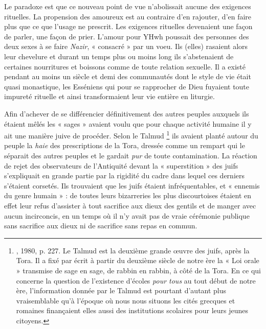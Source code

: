 Le paradoxe est que ce nouveau point de vue n'abolissait aucune des exigences rituelles. La propension des amoureux est au contraire d'en rajouter, d'en faire plus que ce que l'usage ne prescrit. Les exigences rituelles devenaient une façon de parler, une façon de prier. L'amour pour YHwh poussait des personnes des deux sexes à se faire \emph{Nazir}, « consacré » par un voeu. Ils (elles) rasaient alors leur chevelure et durant un temps plus ou moins long ils s'abstenaient de certaines nourritures et boissons comme de toute relation sexuelle. Il a existé pendant au moins un siècle et demi des communautés dont le style de vie était quasi monastique, les Esséniens qui pour se rapprocher de Dieu fuyaient toute impureté rituelle et ainsi transformaient leur vie entière en liturgie.
 
 Afin d'achever de se différencier définitivement des autres peuples auxquels ils étaient mêlés les « sages » avaient voulu que pour chaque activité humaine il y ait une manière juive de procéder. Selon le Talmud%
\footnote{, 1980, p. 227. Le Talmud est la deuxième grande œuvre des juifs, après la Tora. Il a fixé par écrit à partir du deuxième siècle de notre ère la « Loi orale » transmise de sage en sage, de rabbin en rabbin, à côté de la Tora. En ce qui concerne la question de l'existence d'écoles \emph{pour tous} au tout début de notre ère, l'information donnée par le Talmud est pourtant d'autant plus vraisemblable qu'à l'époque où nous nous situons les cités grecques et romaines finançaient elles aussi des institutions scolaires pour leurs jeunes citoyens.}
ils avaient planté autour du peuple la \emph{haie} des prescriptions de la Tora, dressée comme un rempart qui le séparait des autres peuples et le gardait \emph{pur} de toute contamination. La réaction de rejet des observateurs de l'Antiquité devant la « superstition » des juifs s'expliquait en grande partie par la rigidité du cadre dans lequel ces derniers s'étaient corsetés. Ils trouvaient que les juifs étaient infréquentables, et « ennemis du genre humain » : de toutes leurs bizarreries les plus discourtoises étaient en effet leur refus d'assister à tout sacrifice aux dieux des gentils et de manger avec aucun incirconcis, en un temps où il n'y avait pas de vraie cérémonie publique sans sacrifice aux dieux ni de sacrifice sans repas en commun. 

